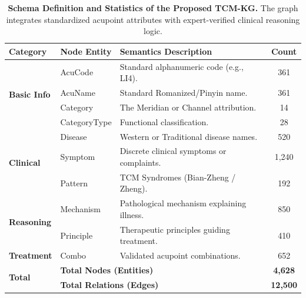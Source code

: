 \documentclass[preprint,5p,times,twocolumn,fleqn]{elsarticle}
\begin{document}
\begin{table}[t] 
    \centering
    \caption{\textbf{Schema Definition and Statistics of the Proposed TCM-KG.} The graph integrates standardized acupoint attributes with expert-verified clinical reasoning logic.}
    \label{tab:kg_schema}
    
    \normalsize 
    \renewcommand{\arraystretch}{1.2}
    
    \begin{tabularx}{\textwidth}{l l X c}
        \toprule
        \textbf{Category} & \textbf{Node Entity} & \textbf{Semantics Description} & \textbf{Count} \\
        \midrule
        
        \multirow{4}{*}{\textbf{Basic Info}} 
          & AcuCode & Standard alphanumeric code (e.g., LI4). & 361 \\
          & AcuName & Standard Romanized/Pinyin name. & 361 \\
          & Category & The Meridian or Channel attribution. & 14 \\
          & CategoryType & Functional classification. & 28 \\
        \midrule
        
        \multirow{3}{*}{\textbf{Clinical}} 
          & Disease & Western or Traditional disease names. & 520 \\
          & Symptom & Discrete clinical symptoms or complaints. & 1,240 \\
          & Pattern & TCM Syndromes (Bian-Zheng / Zheng). & 192 \\
        \midrule
        
        \multirow{2}{*}{\textbf{Reasoning}} 
          & Mechanism & Pathological mechanism explaining illness. & 850 \\
          & Principle & Therapeutic principles guiding treatment. & 410 \\
        \midrule
        
        \textbf{Treatment} 
          & Combo & Validated acupoint combinations. & 652 \\
        \midrule
        
        \multirow{2}{*}{\textbf{Total}} 
          & \multicolumn{2}{l}{\textbf{Total Nodes (Entities)}} & \textbf{4,628} \\
          & \multicolumn{2}{l}{\textbf{Total Relations (Edges)}} & \textbf{12,500} \\
        \bottomrule
    \end{tabularx}
\end{table}
\end{document}
